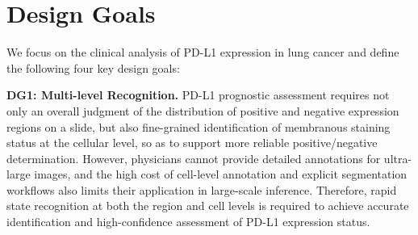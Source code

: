 \documentclass[journal]{vgtc}                     %
\begin{document}

\section{Design Goals}
We focus on the clinical analysis of PD-L1 expression in lung cancer and define the following four key design goals:

\textbf{DG1: Multi-level Recognition.}
PD-L1 prognostic assessment requires not only an overall judgment of the distribution of positive and negative expression regions on a slide, but also fine-grained identification of membranous staining status at the cellular level, so as to support more reliable positive/negative determination. However, physicians cannot provide detailed annotations for ultra-large images, and the high cost of cell-level annotation and explicit segmentation workflows also limits their application in large-scale inference. Therefore, rapid state recognition at both the region and cell levels is required to achieve accurate identification and high-confidence assessment of PD-L1 expression status.
\end{document}
